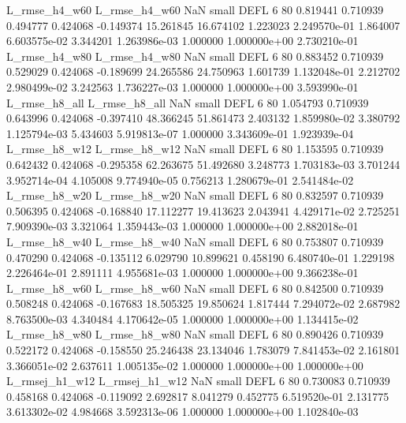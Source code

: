  L_rmse_h4_w60  L_rmse_h4_w60                   NaN      small     DEFL                 6 80 0.819441       0.710939 0.494777       0.424068   -0.149374     15.261845     16.674102     1.223023   2.249570e-01  1.864007 6.603575e-02     3.344201   1.263986e-03            1.000000    1.000000e+00        2.730210e-01
 L_rmse_h4_w80  L_rmse_h4_w80                   NaN      small     DEFL                 6 80 0.883452       0.710939 0.529029       0.424068   -0.189699     24.265586     24.750963     1.601739   1.132048e-01  2.212702 2.980499e-02     3.242563   1.736227e-03            1.000000    1.000000e+00        3.593990e-01
 L_rmse_h8_all  L_rmse_h8_all                   NaN      small     DEFL                 6 80 1.054793       0.710939 0.643996       0.424068   -0.397410     48.366245     51.861473     2.403132   1.859980e-02  3.380792 1.125794e-03     5.434603   5.919813e-07            1.000000    3.343609e-01        1.923939e-04
 L_rmse_h8_w12  L_rmse_h8_w12                   NaN      small     DEFL                 6 80 1.153595       0.710939 0.642432       0.424068   -0.295358     62.263675     51.492680     3.248773   1.703183e-03  3.701244 3.952714e-04     4.105008   9.774940e-05            0.756213    1.280679e-01        2.541484e-02
 L_rmse_h8_w20  L_rmse_h8_w20                   NaN      small     DEFL                 6 80 0.832597       0.710939 0.506395       0.424068   -0.168840     17.112277     19.413623     2.043941   4.429171e-02  2.725251 7.909390e-03     3.321064   1.359443e-03            1.000000    1.000000e+00        2.882018e-01
 L_rmse_h8_w40  L_rmse_h8_w40                   NaN      small     DEFL                 6 80 0.753807       0.710939 0.470290       0.424068   -0.135112      6.029790     10.899621     0.458190   6.480740e-01  1.229198 2.226464e-01     2.891111   4.955681e-03            1.000000    1.000000e+00        9.366238e-01
 L_rmse_h8_w60  L_rmse_h8_w60                   NaN      small     DEFL                 6 80 0.842500       0.710939 0.508248       0.424068   -0.167683     18.505325     19.850624     1.817444   7.294072e-02  2.687982 8.763500e-03     4.340484   4.170642e-05            1.000000    1.000000e+00        1.134415e-02
 L_rmse_h8_w80  L_rmse_h8_w80                   NaN      small     DEFL                 6 80 0.890426       0.710939 0.522172       0.424068   -0.158550     25.246438     23.134046     1.783079   7.841453e-02  2.161801 3.366051e-02     2.637611   1.005135e-02            1.000000    1.000000e+00        1.000000e+00
L_rmsej_h1_w12 L_rmsej_h1_w12                   NaN      small     DEFL                 6 80 0.730083       0.710939 0.458168       0.424068   -0.119092      2.692817      8.041279     0.452775   6.519520e-01  2.131775 3.613302e-02     4.984668   3.592313e-06            1.000000    1.000000e+00        1.102840e-03
